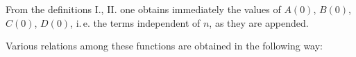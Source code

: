 From the definitions I., II. one obtains immediately the values of
$A(0)$, $B(0)$, $C(0)$, $D(0)$, i.\,e. the terms independent of
$n$, as they are appended.

Various relations among these functions are obtained in
the following way:
